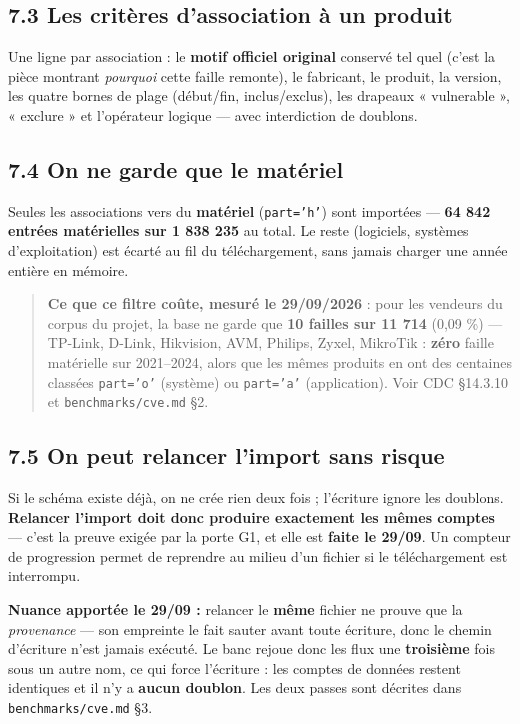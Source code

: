 \documentclass[11pt,a4paper]{article}
\begin{document}
\subsection*{7.3 Les critères d'association à un produit}
Une ligne par association : le \textbf{motif officiel original} conservé tel quel (c'est la pièce montrant \textit{pourquoi} cette faille remonte), le fabricant, le produit, la version, les quatre bornes de plage (début/fin, inclus/exclus), les drapeaux « vulnerable », « exclure » et l'opérateur logique — avec interdiction de doublons.

\subsection*{7.4 On ne garde que le matériel}
Seules les associations vers du \textbf{matériel} (\texttt{part='h'}) sont importées — \textbf{64 842 entrées matérielles sur 1 838 235} au total. Le reste (logiciels, systèmes d'exploitation) est écarté au fil du téléchargement, sans jamais charger une année entière en mémoire.

\begin{quote}\small \textbf{Ce que ce filtre coûte, mesuré le 29/09/2026} : pour les vendeurs du corpus du projet, la base ne garde que \textbf{10 failles sur 11 714} (0,09 \%) — TP-Link, D-Link, Hikvision, AVM, Philips, Zyxel, MikroTik : \textbf{zéro} faille matérielle sur 2021–2024, alors que les mêmes produits en ont des centaines classées \texttt{part='o'} (système) ou \texttt{part='a'} (application). Voir CDC §14.3.10 et \texttt{benchmarks/cve.md} §2.\end{quote}
\subsection*{7.5 On peut relancer l'import sans risque}
Si le schéma existe déjà, on ne crée rien deux fois ; l'écriture ignore les doublons. \textbf{Relancer l'import doit donc produire exactement les mêmes comptes} — c'est la preuve exigée par la porte G1, et elle est \textbf{faite le 29/09}. Un compteur de progression permet de reprendre au milieu d'un fichier si le téléchargement est interrompu.

\textbf{Nuance apportée le 29/09 :} relancer le \textbf{même} fichier ne prouve que la \textit{provenance} — son empreinte le fait sauter avant toute écriture, donc le chemin d'écriture n'est jamais exécuté. Le banc rejoue donc les flux une \textbf{troisième} fois sous un autre nom, ce qui force l'écriture : les comptes de données restent identiques et il n'y a \textbf{aucun doublon}. Les deux passes sont décrites dans \texttt{benchmarks/cve.md} §3.
\end{document}
